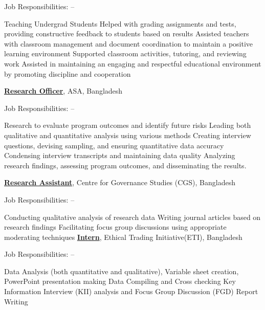 \documentclass[letterpaper,MMMyyyy,nonstopmode]{simpleresumecv}
\begin{document}
\begin{Body}
\Gap
\BulletItem
Job Responsibilities:
\hfill
{} --
\begin{Detail} 
\SubBulletItem
Teaching Undergrad Students
\SubBulletItem
Helped with grading assignments and tests, providing constructive feedback to students based on results
\SubBulletItem
Assisted teachers with classroom management and document coordination to maintain a positive learning environment
\SubBulletItem
Supported classroom activities, tutoring, and reviewing work
\SubBulletItem
Assisted in maintaining an engaging and respectful educational environment by promoting discipline and cooperation

\BigGap
\Entry
\href{http://www.example.com/my-institute}
{\textbf{Research Officer}},
ASA, Bangladesh

\Gap
\BulletItem
Job Responsibilities:
\hfill
{} --
\begin{Detail} 
\SubBulletItem
Research to evaluate program outcomes and identify future risks
\SubBulletItem
Leading both qualitative and quantitative analysis using various methods
\SubBulletItem
Creating interview questions, devising sampling, and ensuring quantitative data accuracy
\SubBulletItem
Condensing interview transcripts and maintaining data quality
\SubBulletItem
Analyzing research findings, assessing program outcomes, and disseminating the results.

\BigGap
\Entry
\href{http://www.example.com/my-institute}
{\textbf{Research Assistant}},
Centre for Governance Studies (CGS), Bangladesh

\Gap
\BulletItem
Job Responsibilities:
\hfill
{} --
\begin{Detail}
\SubBulletItem
Conducting qualitative analysis of research data
\SubBulletItem
Writing journal articles based on research findings
\SubBulletItem
Facilitating focus group discussions using appropriate moderating techniques
\BigGap
\Entry
\href{http://www.example.com/my-institute}
{\textbf{Intern}},
Ethical Trading Initiative(ETI), Bangladesh

\Gap
\BulletItem
Job Responsibilities:
\hfill
{} --
\begin{Detail} 
\SubBulletItem
Data Analysis (both quantitative and qualitative), Variable sheet creation, PowerPoint presentation making
\SubBulletItem
Data Compiling and Cross checking
\SubBulletItem
Key Information Interview (KII) analysis and Focus Group Discussion (FGD)
\SubBulletItem
Report Writing
\end{Detail}


\end{Detail}
\end{Detail}
\end{Detail}
\end{Body}
\end{document}
